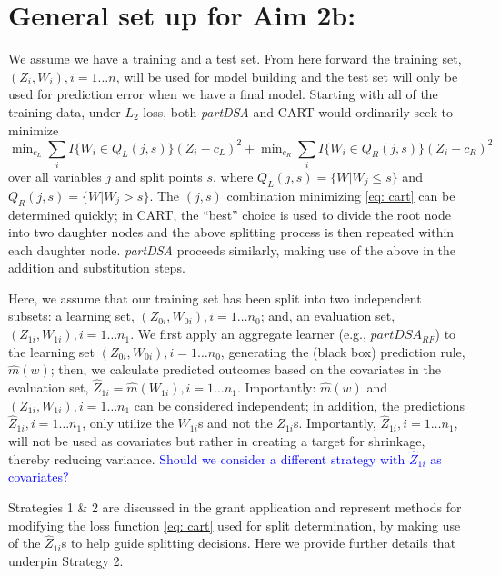 \documentclass[12pt]{article}
\begin{document}
\section{General set up for Aim 2b:}


We assume we have a training and a test set. From here forward the training set, $(Z_i,W_i), i = 1 \ldots n$, will be used for model building and the test set will only be used for prediction error when we have a final model. Starting with all of the training data, under $L_2$ loss,
both \emph{partDSA} and CART would ordinarily seek to minimize
\begin{equation} \label{eq: cart}
	\min\nolimits_{c_L} {\textstyle \sum\nolimits}_i I\{ W_{i} \in Q_{L}(j,s) \} (Z_{i}-c_L)^2
	+ \min\nolimits_{c_R} {\textstyle \sum\nolimits}_i
	I\{ W_{i} \in Q_{R}(j,s) \}
	(Z_{i}-c_R)^2
\end{equation}
over all variables $j$ and split points $s$, where
$Q_{L}(j,s) = \{W|W_{j} \leq s\}$ and $Q_{R}(j,s) = \{W|W_{j} >
s\}$.  %
The $(j,s)$ combination minimizing \eqref{eq: cart} can be determined
quickly; in CART, the ``best'' choice is used to divide the root node into
two daughter nodes and the above splitting process is then repeated
within each daughter node. \emph{partDSA} proceeds similarly, making use of the
above in the addition and substitution steps. 

Here, we assume that our training set has been split into two independent
subsets: a learning set, $(Z_{0i},W_{0i}), i = 1 \ldots n_0$; and, an evaluation set,
$(Z_{1i}, W_{1i}), i = 1 \ldots n_1$. We first apply an aggregate
learner (e.g., $partDSA_{RF}$) to the learning set $(Z_{0i}, W_{0i}),
i = 1 \ldots n_0$, generating the (black box) prediction rule,
$\hat{m}(w)$; then, we calculate predicted outcomes based on the covariates in the evaluation set,
$\widehat{Z}_{1i} = \hat{m}(W_{1i}), i = 1 \ldots n_1$.  Importantly:
$\hat{m}(w)$ and $(Z_{1i}, W_{1i}), i = 1 \ldots n_1$ can be
considered independent; in addition, the predictions
$\widehat{Z}_{1i}, i = 1 \ldots n_1$, only utilize the $W_{1i}$s and not
the $Z_{1i}$s. Importantly, $\widehat{Z}_{1i}, i = 1 \ldots n_1$, will
not be used as covariates but rather in creating a target for
shrinkage, thereby reducing variance. \textcolor{blue}{Should we consider a different strategy with $\widehat{Z}_{1i}$ as covariates?}

 Strategies 1 \& 2 are
discussed in the grant application and represent methods for modifying
the loss function \eqref{eq: cart} used for split determination,
by making use of the $\widehat{Z}_{1i}$s to help guide splitting
decisions. Here we provide further details that underpin
Strategy 2.
\end{document}
